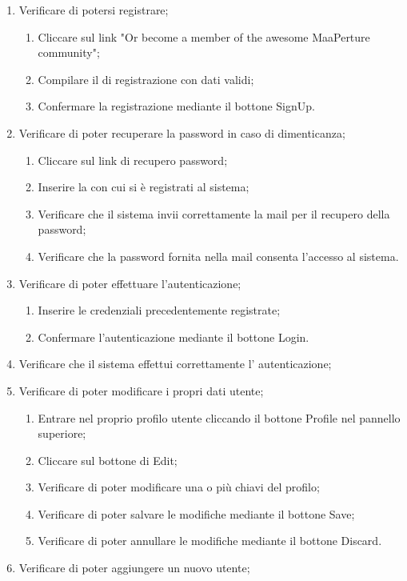 \begin{enumerate}
\item Verificare di potersi registrare;
\begin{enumerate}
\item Cliccare sul link "Or become a member of the awesome MaaPerture community";
\item Compilare il  di registrazione con dati validi;
\item Confermare la registrazione mediante il bottone SignUp.
\end{enumerate}
\item Verificare di poter recuperare la password in caso di dimenticanza;
\begin{enumerate}
\item Cliccare sul link di recupero password;
\item Inserire la  con cui si è registrati al sistema;
\item Verificare che il sistema invii correttamente la mail per il recupero della password;
\item Verificare che la password fornita nella mail consenta l'accesso al sistema.
\end{enumerate}
\item Verificare di poter effettuare l'autenticazione;
\begin{enumerate}
\item Inserire le credenziali precedentemente registrate;
\item Confermare l'autenticazione mediante il bottone Login.
\end{enumerate}
\item Verificare che il sistema effettui correttamente l' autenticazione;
\item Verificare di poter modificare i propri dati utente;
\begin{enumerate}
\item Entrare nel proprio profilo utente cliccando il bottone Profile nel pannello superiore;
\item Cliccare sul bottone di Edit;
\item Verificare di poter modificare una o più chiavi del profilo;
\item Verificare di poter salvare le modifiche mediante il bottone Save;
\item Verificare di poter annullare le modifiche mediante il bottone Discard.
\end{enumerate}
\item Verificare di poter aggiungere un nuovo utente;

\end{enumerate}
